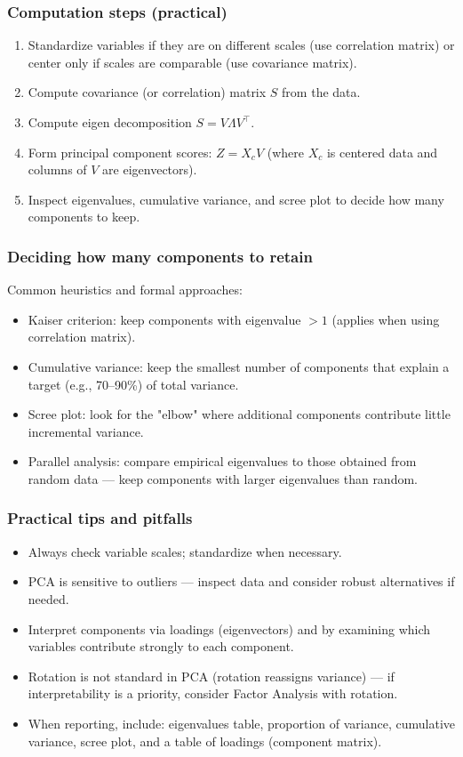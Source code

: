 \documentclass[aspectratio=169]{beamer}
\begin{document}
\begin{frame}
    \frametitle{Computation steps (practical)}
    \begin{enumerate}
        \item Standardize variables if they are on different scales (use correlation matrix) or center only if scales are comparable (use covariance matrix). \pause
        \item Compute covariance (or correlation) matrix $S$ from the data. \pause
        \item Compute eigen decomposition $S=V\Lambda V^{\top}$. \pause
        \item Form principal component scores: $Z = X_c V$ (where $X_c$ is centered data and columns of $V$ are eigenvectors). \pause
        \item Inspect eigenvalues, cumulative variance, and scree plot to decide how many components to keep. \pause
    \end{enumerate}
\end{frame}

\begin{frame}
    \frametitle{Deciding how many components to retain}
    Common heuristics and formal approaches:
    \begin{itemize}
        \item Kaiser criterion: keep components with eigenvalue $>1$ (applies when using correlation matrix). \pause
        \item Cumulative variance: keep the smallest number of components that explain a target (e.g., 70--90\%) of total variance. \pause
        \item Scree plot: look for the "elbow" where additional components contribute little incremental variance. \pause
        \item Parallel analysis: compare empirical eigenvalues to those obtained from random data — keep components with larger eigenvalues than random. \pause
    \end{itemize}
\end{frame}

\begin{frame}
    \frametitle{Practical tips and pitfalls}
    \begin{itemize}
        \item Always check variable scales; standardize when necessary. \pause
        \item PCA is sensitive to outliers — inspect data and consider robust alternatives if needed. \pause
        \item Interpret components via loadings (eigenvectors) and by examining which variables contribute strongly to each component. \pause
        \item Rotation is not standard in PCA (rotation reassigns variance) — if interpretability is a priority, consider Factor Analysis with rotation. \pause
        \item When reporting, include: eigenvalues table, proportion of variance, cumulative variance, scree plot, and a table of loadings (component matrix). \pause
    \end{itemize}
\end{frame}
\end{document}
